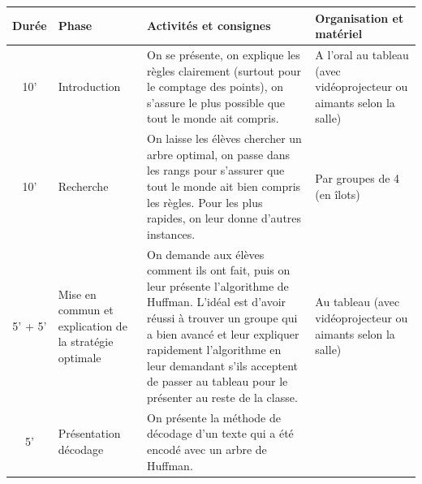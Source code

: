 \documentclass[12pt, a4paper]{article}
\begin{document}
	\begin{longtable}{c|m{3.9cm}|m{8.4cm}|m{2.4cm}}		\textbf{Durée} & \textbf{Phase} & \textbf{Activités et consignes} & \textbf{Organisation et matériel} \\ \hline\hline
		
		10' &
		
		Introduction
		
		&
		
		On se présente, on explique les règles clairement (surtout pour le comptage des points), on s'assure le plus possible que tout
    le monde ait compris.
		
		&
		
		A l'oral au tableau (avec vidéoprojecteur ou aimants selon la salle)
		
		\\ \hline
		
	  10' &
		
    Recherche
		
		&
		
	  On laisse les élèves chercher un arbre optimal, on passe dans les rangs pour s'assurer que tout le monde ait bien compris les règles.
    Pour les plus rapides, on leur donne d'autres instances.
		
		& Par groupes de 4 (en îlots)
		
		\\ \hline
		
		5' + 5' &
		
		Mise en commun et explication de la stratégie optimale
		
		&
		
	  On demande aux élèves comment ils ont fait, puis on leur présente l'algorithme de Huffman. L'idéal est d'avoir réussi
    à trouver un groupe qui a bien avancé et leur expliquer rapidement l'algorithme en leur demandant s'ils acceptent de
    passer au tableau pour le présenter au reste de la classe.

		&
		
		Au tableau (avec vidéoprojecteur ou aimants selon la salle)
		
		\\ \hline
		
		5'
		
		&
		
	  Présentation décodage
		
		&
		
		On présente la méthode de décodage d'un texte qui a été encodé avec un arbre de Huffman.
		

\end{longtable}
\end{document}
